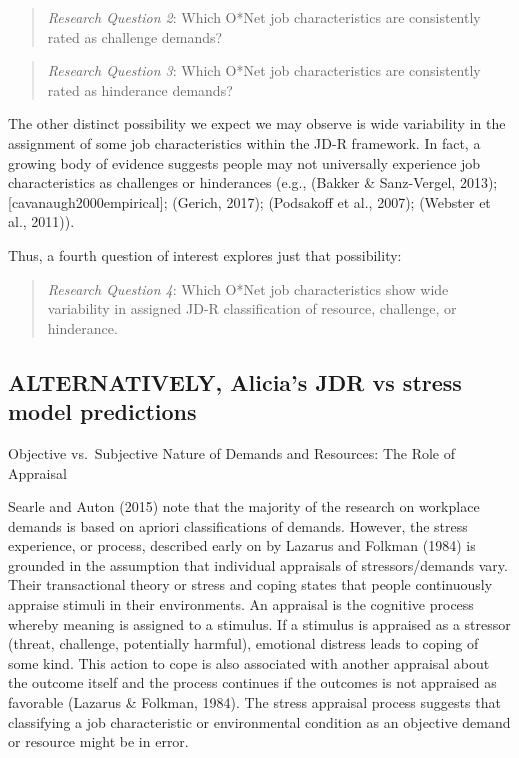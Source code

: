 \documentclass[
  english,
  man]{apa6}
\begin{document}
\begin{quote}
\emph{Research Question 2}: Which O*Net job characteristics are consistently rated as challenge demands?
\end{quote}

\begin{quote}
\emph{Research Question 3}: Which O*Net job characteristics are consistently rated as hinderance demands?
\end{quote}

The other distinct possibility we expect we may observe is wide variability in the assignment of some job characteristics within the JD-R framework. In fact, a growing body of evidence suggests people may not universally experience job characteristics as challenges or hinderances (e.g., (Bakker \& Sanz-Vergel, 2013); {[}cavanaugh2000empirical{]}; (Gerich, 2017); (Podsakoff et al., 2007); (Webster et al., 2011)).

Thus, a fourth question of interest explores just that possibility:

\begin{quote}
\emph{Research Question 4}: Which O*Net job characteristics show wide variability in assigned JD-R classification of resource, challenge, or hinderance.
\end{quote}

\hypertarget{alternatively-alicias-jdr-vs-stress-model-predictions}{%
\subsection{ALTERNATIVELY, Alicia's JDR vs stress model predictions}\label{alternatively-alicias-jdr-vs-stress-model-predictions}}

Objective vs.~Subjective Nature of Demands and Resources: The Role of Appraisal

Searle and Auton (2015) note that the majority of the research on workplace demands is based on apriori classifications of demands. However, the stress experience, or process, described early on by Lazarus and Folkman (1984) is grounded in the assumption that individual appraisals of stressors/demands vary. Their transactional theory or stress and coping states that people continuously appraise stimuli in their environments. An appraisal is the cognitive process whereby meaning is assigned to a stimulus. If a stimulus is appraised as a stressor (threat, challenge, potentially harmful), emotional distress leads to coping of some kind. This action to cope is also associated with another appraisal about the outcome itself and the process continues if the outcomes is not appraised as favorable (Lazarus \& Folkman, 1984). The stress appraisal process suggests that classifying a job characteristic or environmental condition as an objective demand or resource might be in error.
\end{document}
